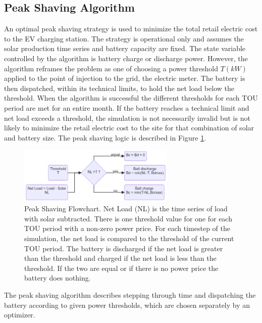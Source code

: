 \documentclass[journal,article,submit,pdftex,moreauthors]{Definitions/mdpi}
\begin{document}
\subsection{Peak Shaving Algorithm}\label{peak-shaving-algorithm}%

An optimal peak shaving strategy is used to minimize the total retail electric cost to the EV charging station. The strategy is operational only and assumes the solar production time series and battery capacity are fixed. The state variable controlled by the algorithm is battery charge or discharge power. However, the algorithm reframes the problem as one of choosing a power threshold $T (kW)$ applied to the point of injection to the grid, the electric meter. The battery is then dispatched, within its technical limits, to hold the net load below the threshold. When the algorithm is successful the different thresholds for each TOU period are met for an entire month. If the battery reaches a technical limit and net load exceeds a threshold, the simulation is not necessarily invalid but is not likely to minimize the retail electric cost to the site for that combination of solar and battery size. The peak shaving logic is described in Figure \ref{fig:peakshaving-flowchart}.

\begin{figure}
  \centering
  \includegraphics[width=7.5cm]{./images/peak shaving flowchart.png}
  \caption{Peak Shaving Flowchart. Net Load (NL) is the time series of load with solar subtracted. There is one threshold value for one for each TOU period with a non-zero power price. For each timestep of the simulation, the net load is compared to the threshold of the current TOU period. The battery is discharged if the net load is greater than the threshold and charged if the net load is less than the threshold. If the two are equal or if there is no power price the battery does nothing.}
  \label{fig:peakshaving-flowchart}
\end{figure}

The peak shaving algorithm describes stepping through time and dispatching the battery according to given power thresholds, which are chosen separately by an optimizer.
\end{document}
